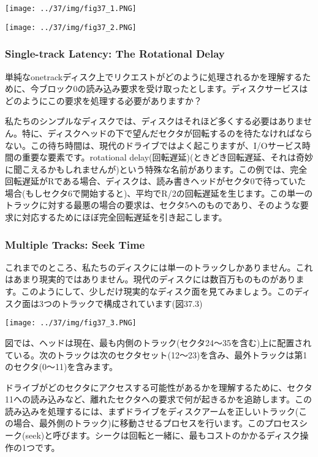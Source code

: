 \texttt{[image: ../37/img/fig37\_1.PNG]}

\texttt{[image: ../37/img/fig37\_2.PNG]}

\hypertarget{single-track-latency-the-rotational-delay}{%
\subsubsection*{Single-track Latency: The Rotational
Delay}\label{single-track-latency-the-rotational-delay}}

単純なonetrackディスク上でリクエストがどのように処理されるかを理解するために、今ブロック0の読み込み要求を受け取ったとします。ディスクサービスはどのようにこの要求を処理する必要がありますか？

私たちのシンプルなディスクでは、ディスクはそれほど多くする必要はありません。特に、ディスクヘッドの下で望んだセクタが回転するのを待たなければならない。この待ち時間は、現代のドライブではよく起こりますが、I/Oサービス時間の重要な要素です。rotational
delay(回転遅延)(ときどき回転遅延、それは奇妙に聞こえるかもしれませんが)という特殊な名前があります。この例では、完全回転遅延がRである場合、ディスクは、読み書きヘッドがセクタ0で待っていた場合(もしセクタ6で開始すると)、平均でR/2の回転遅延を生じます。この単一のトラックに対する最悪の場合の要求は、セクタ5へのものであり、そのような要求に対応するためにほぼ完全回転遅延を引き起こします。

\hypertarget{multiple-tracks-seek-time}{%
\subsubsection*{Multiple Tracks: Seek
Time}\label{multiple-tracks-seek-time}}

これまでのところ、私たちのディスクには単一のトラックしかありません。これはあまり現実的ではありません。現代のディスクには数百万ものものがあります。このようにして、少しだけ現実的なディスク面を見てみましょう。このディスク面は3つのトラックで構成されています(図37.3)

\texttt{[image: ../37/img/fig37\_3.PNG]}

図では、ヘッドは現在、最も内側のトラック(セクタ24〜35を含む)上に配置されている。次のトラックは次のセクタセット(12〜23)を含み、最外トラックは第1のセクタ(0〜11)を含みます。

ドライブがどのセクタにアクセスする可能性があるかを理解するために、セクタ11への読み込みなど、離れたセクタへの要求で何が起きるかを追跡します。この読み込みを処理するには、まずドライブをディスクアームを正しいトラック(この場合、最外側のトラック)に移動させるプロセスを行います。このプロセスシーク(seek)と呼びます。シークは回転と一緒に、最もコストのかかるディスク操作の1つです。

